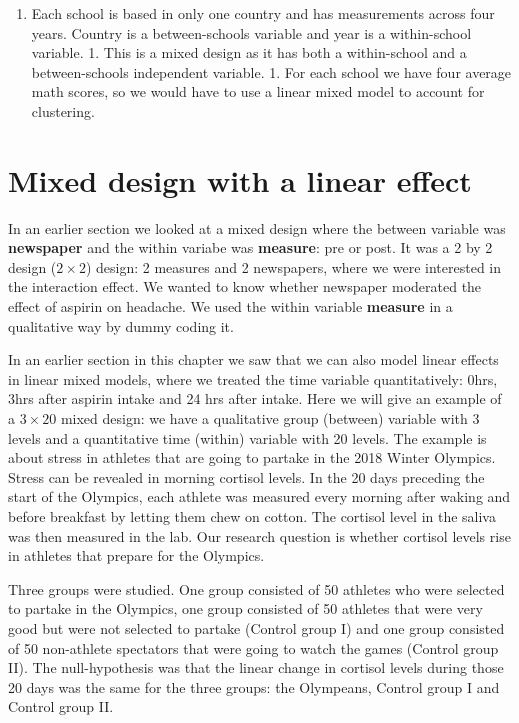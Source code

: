 \documentclass[]{book}\usepackage[]{graphicx}\usepackage[]{color}
\begin{document}
\begin{enumerate}
\item

Each school is based in only one country and has measurements across four years. Country is a between-schools variable and year is a within-school variable.
1. This is a mixed design as it has both a within-school and a between-schools independent variable. 
1. For each school we have four average math scores, so we would have to use a linear mixed model to account for clustering.



\end{enumerate}





\section{Mixed design with a linear effect}

In an earlier section we looked at a mixed design where the between variable was \textbf{newspaper} and the within variabe was \textbf{measure}: pre or post. It was a 2 by 2 design ($2 \times 2$) design: 2 measures and 2 newspapers, where we were interested in the interaction effect. We wanted to know whether newspaper moderated the effect of aspirin on headache. We used the within variable \textbf{measure} in a qualitative way by dummy coding it. 

In an earlier section in this chapter we saw that we can also model linear effects in linear mixed models, where we treated the time variable quantitatively: 0hrs, 3hrs after aspirin intake and 24 hrs after intake. Here we will give an example of a $3 \times 20$ mixed design: we have a qualitative group (between) variable with 3 levels and a quantitative time (within) variable with 20 levels. The example is about stress in athletes that are going to partake in the 2018 Winter Olympics. Stress can be revealed in morning cortisol levels. In the 20 days preceding the start of the Olympics, each athlete was measured every morning after waking and before breakfast by letting them chew on cotton. The cortisol level in the saliva was then measured in the lab. Our research question is whether cortisol levels rise in athletes that prepare for the Olympics.

Three groups were studied. One group consisted of 50 athletes who were selected to partake in the Olympics, one group consisted of 50 athletes that were very good but were not selected to partake (Control group I) and one group consisted of 50 non-athlete spectators that were going to watch the games (Control group II). The null-hypothesis was that the linear change in cortisol levels during those 20 days was the same for the three groups: the Olympeans, Control group I and Control group II. 
\end{document}
